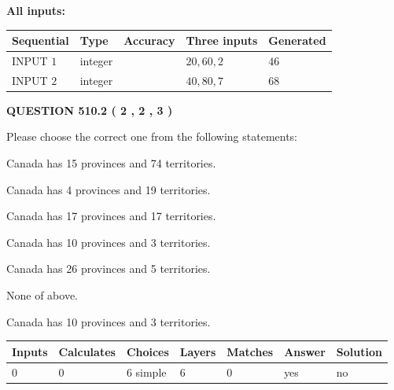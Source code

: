 \documentclass[12pt]{article}
\begin{document}
   
   
   
\noindent\vspace{0.1in}\hspace{-0.08in} {\textbf{\Large{All inputs: }}}
   
   
  
  
\noindent\begin{tabular}{|l|l|l|l|l|}
\hline
 Sequential & Type & Accuracy & Three inputs & Generated \\ 
\hline
 
 
  INPUT $  1 $ & integer &  & $
 20
 , 
 60
 , 
 2
 $ & $ 46 $ 
 \\  \hline  
 
 
  INPUT $  2 $ & integer &  & $
 40
 , 
 80
 , 
 7
 $ & $ 68 $ 
 \\  \hline  
 \end{tabular}
   
   
  
\vspace{0.2in}
  
{\textbf{\Large{QUESTION
510.2 
 ( 2 , 2 , 3 )
}}}
  
  
Please choose the correct one from the following statements:
 
 
Canada has  15 provinces and  74 territories.
 
 
Canada has   4 provinces and  19 territories.
 
 
Canada has  17 provinces and  17 territories.
 
 
Canada has 10  provinces and 3 territories.
 
 
Canada has  26 provinces and  5 territories.
 
 
 None of above.
 
 
\noindent{}
 
 
Canada has 10  provinces and 3 territories.
 
 
\noindent{}
 
 
   
   
   
   
\noindent\begin{tabular}{|l|l|l|l|l|l|l|}
 \hline
Inputs & Calculates & Choices & Layers & Matches & Answer & Solution \\ \hline
 0  & 
 0  & 
 6
  simple  
  & 
 6  & 
 0  & 
  yes & 
  no 
  \\ \hline
 \end{tabular}
   
\end{document}

